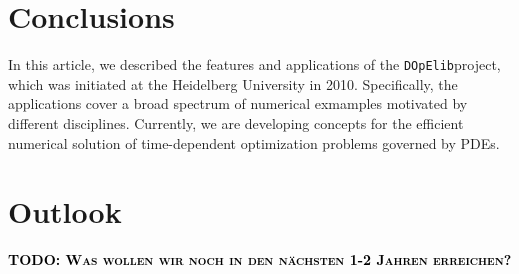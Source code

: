 \documentclass[prodmode,acmtoms]{acmsmall}
\numberwithin{equation}{section}
\newcommand{\dope}{\texttt{DOpElib}}
\newcommand{\todo}[1]{\textbf{\textsc{\textcolor{black}{TODO: #1}}}}
\begin{document}
\section{Conclusions}
\label{conclusions}
In this article, we described the features 
and applications of the \dope project, which 
was initiated at the Heidelberg University in 2010.
Specifically, the applications cover a broad 
spectrum of numerical exmamples motivated 
by different disciplines. 
Currently, we are developing concepts for the efficient 
numerical solution of time-dependent optimization
problems governed by PDEs. 

\section{Outlook}
\todo{Was wollen wir noch in den nächsten 1-2 Jahren erreichen?}

%


%
\end{document}
